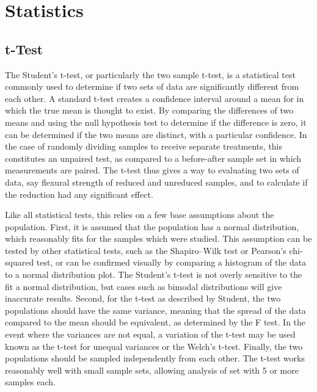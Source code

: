 
\chapter{Statistics}

\section{t-Test}
    \label{app:ttest}
    The Student's t-test, or particularly the two sample t-test, is a statistical test commonly used to determine if two sets of data are significantly different from each other.
    A standard t-test creates a confidence interval around a mean for in which the true mean is thought to exist.
    By comparing the differences of two means and using the null hypothesis test to determine if the difference is zero, it can be determined if the two means are distinct, with a particular confidence.
    In the case of randomly dividing samples to receive separate treatments, this constitutes an unpaired test, as compared to a before-after sample set in which measurements are paired.
    The t-test thus gives a way to evaluating two sets of data, say flexural strength of reduced and unreduced samples, and to calculate if the reduction had any significant effect.

    Like all statistical tests, this relies on a few base assumptions about the population.
    First, it is assumed that the population has a normal distribution, which reasonably fits for the samples which were studied.
    This assumption can be tested by other statistical tests, such as the Shapiro–Wilk test or Pearson's chi-squared test, or can be confirmed visually by comparing a histogram of the data to a normal distribution plot.
    The Student's t-test is not overly sensitive to the fit a normal distribution, but cases such as bimodal distributions will give inaccurate results.\cite{Markowski1990}
    Second, for the t-test as described by Student, the two populations should have the same variance, meaning that the spread of the data compared to the mean should be equivalent, as determined by the F test.
    In the event where the variances are not equal, a variation of the t-test may be used known as the t-test for unequal variances or the Welch's t-test.\cite{Welch1947}
    Finally, the two populations should be sampled independently from each other.
    The t-test works reasonably well with small sample sets, allowing analysis of set with 5 or more samples each.\cite{Moore2009}

